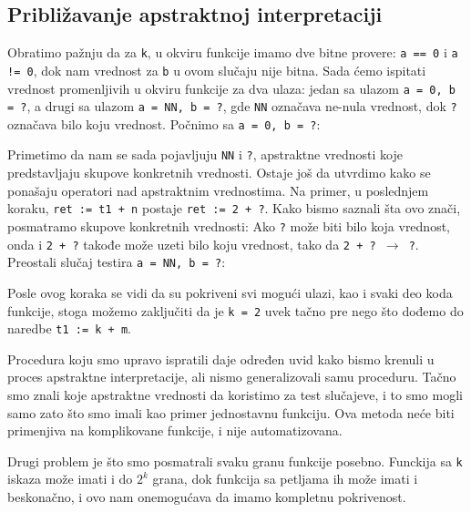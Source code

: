 \subsection{Približavanje apstraktnoj interpretaciji}
\label{subsec:approachingabsint}
Obratimo pažnju da za \texttt{k}, u okviru funkcije imamo dve bitne provere:
\texttt{a == 0} i \texttt{a != 0}, dok nam vrednost za \texttt{b} u ovom slučaju
nije bitna. Sada ćemo ispitati vrednost promenljivih u okviru funkcije za dva ulaza:
jedan sa ulazom \texttt{a = 0, b = ?}, a drugi sa ulazom \texttt{a = NN, b = ?},
gde \texttt{NN} označava ne-nula vrednost, dok \texttt{?} označava bilo koju vrednost.
Počnimo sa \texttt{a = 0, b = ?}:

Primetimo da nam se sada pojavljuju \texttt{NN} i \texttt{?}, apstraktne vrednosti
koje predstavljaju skupove konkretnih vrednosti.
Ostaje još da utvrdimo kako se ponašaju operatori nad apstraktnim vrednostima.
Na primer, u poslednjem koraku, \texttt{ret := t1 + n} postaje \texttt{ret := 2 + ?}.
Kako bismo saznali šta ovo znači, posmatramo skupove konkretnih vrednosti: Ako \texttt{?}
može biti bilo koja vrednost, onda i \texttt{2 + ?} takođe može uzeti bilo koju vrednost,
tako da \texttt{2 + ? $\longrightarrow$ ?}. Preostali slučaj testira \texttt{a = NN, b = ?}:

Posle ovog koraka se vidi da su pokriveni svi mogući ulazi, kao i svaki deo koda
funkcije, stoga možemo zaključiti da je \texttt{k = 2} uvek tačno pre nego što
dođemo do naredbe \texttt{t1 := k + m}.

Procedura koju smo upravo ispratili daje određen uvid kako bismo krenuli u proces
apstraktne interpretacije, ali nismo generalizovali samu proceduru. Tačno smo
znali koje apstraktne vrednosti da koristimo za test slučajeve, i to smo mogli
samo zato što smo imali kao primer jednostavnu funkciju. Ova metoda neće biti
primenjiva na komplikovane funkcije, i nije automatizovana.

Drugi problem je što smo posmatrali svaku granu funkcije posebno. Funckija sa \texttt{k} iskaza može imati i do
\texttt{$2^k$} grana, dok funkcija sa petljama ih može imati i beskonačno, i ovo nam onemogućava da imamo kompletnu
pokrivenost.


